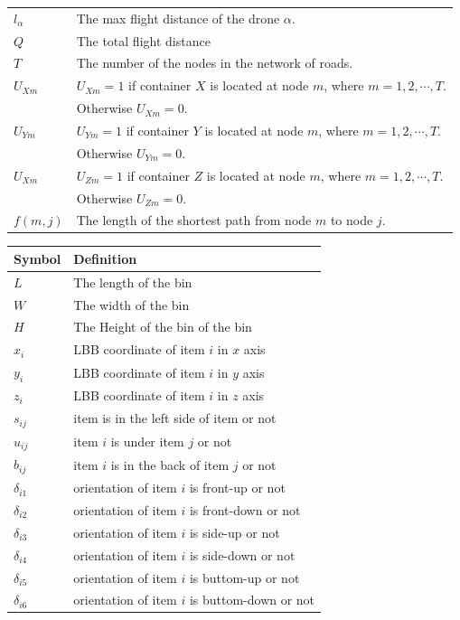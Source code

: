 \documentclass{mcmthesis}
\begin{document}
\begin{tabular}{ll}
	 $l_\alpha$& The max flight distance of the drone $\alpha$.\\
	 
	 $Q$& The total flight distance \\
	 
	 $T$& The number of the nodes in the network of roads.\\
	 
	 $U_{Xm}$& $U_{Xm}=1$ if container $X$ is located at node $m$, where $m=1,2,\cdots,T$.\\ & Otherwise $U_{Xm}=0$.\\
	 
	 $U_{Ym}$& $U_{Ym}=1$ if container $Y$ is located at node $m$, where $m=1,2,\cdots,T$.\\ &Otherwise $U_{Ym}=0$.\\
	 
	 $U_{Xm}$& $U_{Zm}=1$ if container $Z$ is located at node $m$, where $m=1,2,\cdots,T$.\\ &Otherwise $U_{Zm}=0$.\\
	 
	$f(m,j)$& The length of the shortest path from node $m$ to node $j$.\\
	\hline
\end{tabular}

\begin{tabular}{ll}
	\hline
	Symbol&  Definition\\
	\hline	 
	$L$& The length of the bin \\
	$W$& The width of the bin \\
	$H$& The Height of the bin of the bin \\
	
	$x_i$& LBB coordinate of item $i$ in $x$ axis\\
	$y_i$& LBB coordinate of item $i$ in $y$ axis\\
	$z_i$& LBB coordinate of item $i$ in $z$ axis\\
	
	$s_{ij}$& item is in the left side of item or not \\
	$u_{ij}$& item $i$  is under item $j$ or not \\
	$b_{ij}$& item $i$  is in the back of  item $j$ or not \\
	
	$\delta_{i1}$& orientation of item $i$ is front-up or not \\
	$\delta_{i2}$& orientation of item $i$ is front-down or not \\
	$\delta_{i3}$& orientation of item $i$ is side-up or not \\
	$\delta_{i4}$& orientation of item $i$ is side-down or not \\
	$\delta_{i5}$& orientation of item $i$ is buttom-up or not \\
	$\delta_{i6}$& orientation of item $i$ is buttom-down or not \\
	\hline
\end{tabular}
\end{document}
